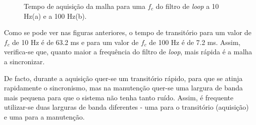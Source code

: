 \documentclass[11pt]{article}
\numberwithin{equation}{section}
\begin{document}
{\begin{figure}[H]
	\centering
	\hspace{8mm}
	\vspace{-0.8em}
	\caption{Tempo de aquisição da malha para uma $f_c$ do filtro de \textit{loop} a 10 Hz(a) e a 100 Hz(b).}
	\vspace{-0.8em}
\end{figure}

Como se pode ver nas figuras anteriores, o tempo de transitório para um valor de $f_c$ de 10 Hz é de 63.2 ms e para um valor de $f_c$ de 100 Hz é de 7.2 ms. Assim, verifica-se que, quanto maior a frequência do filtro de \textit{loop}, mais rápida é a malha a sincronizar. 

De facto, durante a aquisição quer-se um transitório rápido, para que se atinja rapidamente o sincronismo, mas na manutenção quer-se uma largura de banda mais pequena para que o sistema não tenha tanto ruído. Assim, é frequente utilizar-se duas larguras de banda diferentes - uma para o transitório (aquisição) e uma para a manutenção.

}
\end{document}
